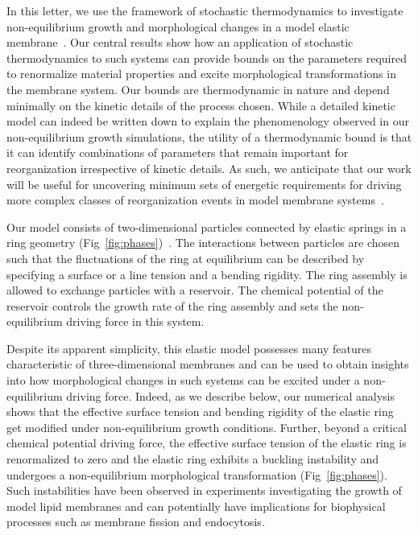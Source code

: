 \documentclass[amsmath,preprintnumbers,10pt,nofootinbib,prl,twocolumn]{revtex4-1}
\begin{document}
In this letter, we use the framework of stochastic thermodynamics to investigate non-equilibrium growth and morphological changes in a model elastic membrane~\cite{Drasdo2000, Ramaswamy2000,Rao2001,Solon2006,Hannezo2011}. Our central results show how an application of stochastic thermodynamics to such systems can provide bounds on the parameters required to renormalize material properties and excite morphological transformations in the membrane system. Our bounds are thermodynamic in nature and depend minimally on the kinetic details of the process chosen. While a detailed kinetic model can indeed be written down to explain the phenomenology observed in our non-equilibrium growth simulations, the utility of a thermodynamic bound is that it can identify combinations of parameters that remain important for reorganization irrespective of kinetic details. As such, we anticipate that our work will be useful for uncovering minimum sets of energetic requirements for driving more complex classes of reorganization events in model membrane systems~\cite{Zwicker2017}. 

Our model consists of two-dimensional particles connected by elastic springs in a ring geometry (Fig~\ref{fig:phases})~\cite{Fisher1989,Rajesh2008}. The interactions between particles are chosen such that the fluctuations of the ring at equilibrium can be described by specifying a surface or a line tension and a bending rigidity. The ring assembly is allowed to exchange particles with a reservoir. The chemical potential of the reservoir controls the growth rate of the ring assembly and sets the non-equilibrium driving force in this system.

Despite its apparent simplicity, this elastic model possesses many features~\cite{W.Helfrich1973,Fisher1989,Ramaswamy2000,Rao2001,Solon2006,Rajesh2008,Hannezo2011,Loubet2012} characteristic of three-dimensional membranes and can be used to obtain insights into how morphological changes in such systems can be excited under a non-equilibrium driving force. Indeed, as we describe below, our numerical analysis shows that the effective surface tension and bending rigidity of the elastic ring get modified under non-equilibrium growth conditions. Further, beyond a critical chemical potential driving force, the effective surface tension of the elastic ring is renormalized to zero and the elastic ring exhibits a buckling instability and undergoes a non-equilibrium morphological transformation (Fig~\ref{fig:phases}). Such instabilities have been observed in experiments investigating the growth of model lipid membranes \cite{Solon2006} and can potentially have implications for biophysical processes such as membrane fission and endocytosis. 
\end{document}
